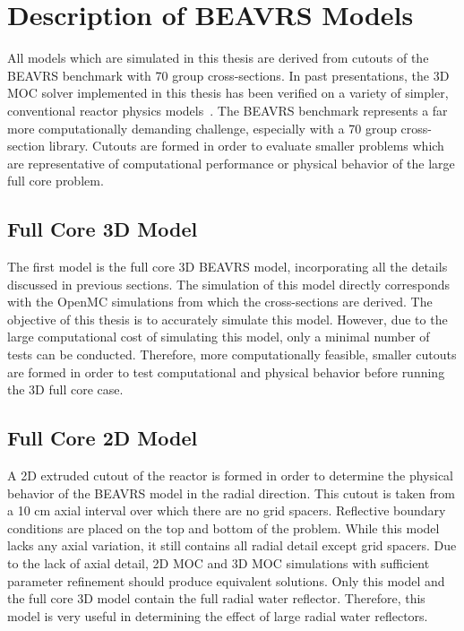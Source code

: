 \newpage
\section{Description of BEAVRS Models}
\label{sec:beavrs-models}

All models which are simulated in this thesis are derived from cutouts of the BEAVRS benchmark with 70 group cross-sections. In past presentations, the 3D \ac{MOC} solver implemented in this thesis has been verified on a variety of simpler, conventional reactor physics models~\cite{physor2016shaner, physor2016otf}. The BEAVRS benchmark represents a far more computationally demanding challenge, especially with a 70 group cross-section library. Cutouts are formed in order to evaluate smaller problems which are representative of computational performance or physical behavior of the large full core problem.

\subsection{Full Core 3D Model}
\label{sec:beavrs-3D}

The first model is the full core 3D BEAVRS model, incorporating all the details discussed in previous sections. The simulation of this model directly corresponds with the OpenMC simulations from which the cross-sections are derived. The objective of this thesis is to accurately simulate this model. However, due to the large computational cost of simulating this model, only a minimal number of tests can be conducted. Therefore, more computationally feasible, smaller cutouts are formed in order to test computational and physical behavior before running the 3D full core case.


\subsection{Full Core 2D Model}
\label{sec:beavrs-2D}

A 2D extruded cutout of the reactor is formed in order to determine the physical behavior of the BEAVRS model in the radial direction. This cutout is taken from a 10 cm axial interval over which there are no grid spacers. Reflective boundary conditions are placed on the top and bottom of the problem. While this model lacks any axial variation, it still contains all radial detail except grid spacers. Due to the lack of axial detail, 2D \ac{MOC} and 3D \ac{MOC} simulations with sufficient parameter refinement should produce equivalent solutions. Only this model and the full core 3D model contain the full radial water reflector. Therefore, this model is very useful in determining the effect of large radial water reflectors. 

